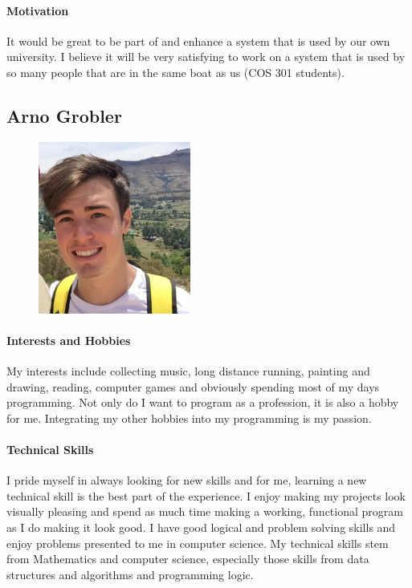 \documentclass[english]{article}
\begin{document}
			\paragraph{Motivation}
			It would be great to be part of and enhance a system that is used by our own university. I believe it will be very satisfying to work on a system that is used by so many people that are in the same boat as us (COS 301 students).
		
		\newpage
		\subsection{Arno Grobler}
			\begin{figure}
				\begin{center}
					\includegraphics[width=5cm]{arno.jpg}
				\end{center}
			\end{figure}
			\paragraph{Interests and Hobbies}
			My interests include collecting music, long distance running, painting and drawing, reading, computer games and obviously spending most of my days programming. Not only do I want to program as a profession, it is also a hobby for me. Integrating my other hobbies into my programming is my passion.
			
			\paragraph{Technical Skills}
            I pride myself in always looking for new skills and for me, learning a new technical skill is the best part of the experience. I enjoy making my projects look visually pleasing and spend as much time making a working, functional program as I do making it look good. I have good logical and problem solving skills and enjoy problems presented to me in computer science. My technical skills stem from Mathematics and computer science, especially those skills from data structures and algorithms and programming logic.
			
\end{document}
